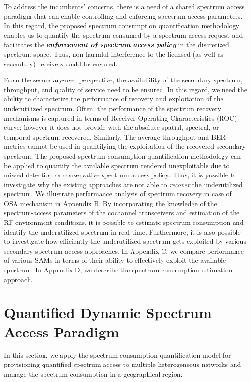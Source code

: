 \documentclass[journal,12pt,draftclsnofoot,onecolumn]{IEEEtran}
\begin{document}
To address the incumbents' concerns, there is a need of a shared spectrum access paradigm that can enable controlling and enforcing spectrum-access parameters. In this regard, the proposed spectrum consumption quantification methodology enables us to quantify the spectrum consumed by a spectrum-access request and facilitates the \textbf{\textit{enforcement of spectrum access policy}} in the discretized spectrum space. Thus, non-harmful interference to the licensed (as well as secondary) receivers could be ensured. 

From the secondary-user perspective, the availability of the secondary spectrum, throughput, and quality of service need to be ensured. In this regard, we need the ability to characterize the performance of recovery and exploitation of the underutilized spectrum. Often, the performance of the spectrum recovery mechanisms is captured in terms of Receiver Operating Characteristics (ROC) curve; however it does not provide with the absolute spatial, spectral, or temporal spectrum recovered. Similarly, The average throughput and BER metrics cannot be used in quantifying the exploitation of the recovered secondary spectrum. The proposed spectrum consumption quantification methodology can be applied to quantify the available spectrum rendered unexploitable due to missed detection or conservative spectrum access policy. Thus, it is possible to investigate why the existing approaches are not able to \textit{recover} the underutilized spectrum. We illustrate performance analysis of spectrum recovery in case of OSA mechanism in Appendix B. By incorporating the knowledge of the spectrum-access parameters of the cochannel transceivers and estimation of the RF environment conditions, it is possible to estimate spectrum consumption and identify the underutilized spectrum in real time. Furthermore, it is also possible to investigate how efficiently the underutilized spectrum gets exploited by various secondary spectrum access approaches. In Appendix C, we compare performance of various SAMs in terms of their ability to effectively exploit the available spectrum. In Appendix D, we describe the spectrum consumption estimation approach.





\section{Quantified Dynamic Spectrum Access Paradigm}

In this section, we apply the spectrum consumption quantification model for provisioning quantified spectrum access to multiple heterogeneous networks and manage the spectrum consumption in a geographical region. 
\end{document}
